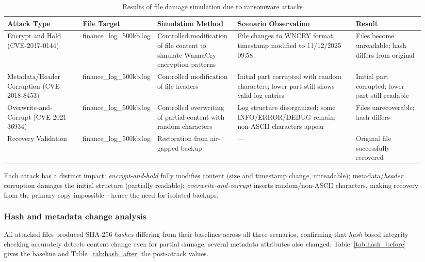 \documentclass{iaesarticle}
\begin{document}
\begin{table}[H]
\centering
\fontsize{8pt}{10pt}\selectfont
\caption{Results of file damage simulation due to ransomware attacks}
\label{tab:damage_simulation}
\begin{tabularx}{\textwidth}{@{}>{\raggedright\arraybackslash}p{2.2cm} >{\raggedright\arraybackslash}p{1.9cm} >{\raggedright\arraybackslash}X >{\raggedright\arraybackslash}X >{\raggedright\arraybackslash}X@{}}
\hline
\textbf{Attack Type} & \textbf{File Target} & \textbf{Simulation Method} & \textbf{Scenario Observation} & \textbf{Result} \\
\hline
Encrypt and Hold (CVE-2017-0144) & finance\_\-log\_\-500kb.log & Controlled modification of file content to simulate WannaCry encryption patterns & File changes to WNCRY format, timestamp modified to 11/12/2025 09:58 & Files become unreadable; hash differs from original \\
Metadata/Header Corruption (CVE-2018-8453) & finance\_\-log\_\-500kb.log & Controlled modification of file headers & Initial part corrupted with random characters; lower part still shows valid log entries & Initial part corrupted; lower part still readable \\
Overwrite-and-Corrupt (CVE-2021-36934) & finance\_\-log\_\-500kb.log & Controlled overwriting of partial content with random characters & Log structure disorganized; some INFO/ERROR/DEBUG remain; non-ASCII characters appear & Files unrecoverable; hash differs \\
Recovery Validation & finance\_\-log\_\-500kb.log & Restoration from air-gapped backup & --- & Original file successfully recovered \\
\hline
\end{tabularx}
\end{table}

Each attack has a distinct impact: \textit{encrypt-and-hold} fully modifies content (size and timestamp change, unreadable); metadata/\textit{header} corruption damages the initial structure (partially readable); \textit{overwrite-and-corrupt} inserts random/non-ASCII characters, making recovery from the primary copy impossible---hence the need for isolated backups.

\subsubsection{Hash and metadata change analysis}
All attacked files produced SHA-256 \textit{hashes} differing from their baselines across all three scenarios, confirming that \textit{hash}-based integrity checking accurately detects content change even for partial damage; several metadata attributes also changed. Table~\ref{tab:hash_before} gives the baseline and Table~\ref{tab:hash_after} the post-attack values.
\end{document}
